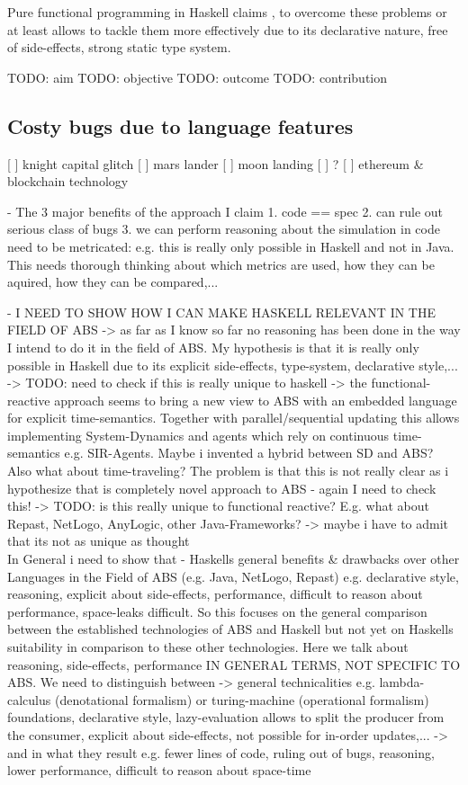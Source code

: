 Pure functional programming in Haskell claims \cite{hudak_history_2007}, \cite{hudak_haskell_1994} to overcome these problems or at least allows to tackle them more effectively due to its declarative nature, free of side-effects, strong static type system. 

TODO: aim 
TODO: objective
TODO: outcome 
TODO: contribution

\subsection{Costy bugs due to language features}
[ ] knight capital glitch
[ ] mars lander
[ ] moon landing
[ ] ?
[ ] ethereum \& blockchain technology

- The 3 major benefits of the approach I claim
	1. code == spec
	2. can rule out serious class of bugs
	3. we can perform reasoning about the simulation in code
	need to be metricated: e.g. this is really only possible in Haskell and not in Java. This needs thorough thinking about which metrics are used, how they can be aquired, how they can be compared,...
	
- I NEED TO SHOW HOW I CAN MAKE HASKELL RELEVANT IN THE FIELD OF ABS
	-> as far as I know so far no reasoning has been done in the way I intend to do it in the field of ABS. My hypothesis is that it is really only possible in Haskell due to its explicit side-effects, type-system, declarative style,... 
		-> TODO: need to check if this is really unique to haskell
	-> the functional-reactive approach seems to bring a new view to ABS with an embedded language for explicit time-semantics. Together with parallel/sequential updating this allows implementing System-Dynamics and agents which rely on continuous time-semantics e.g. SIR-Agents. Maybe i invented a hybrid between SD and ABS? Also what about time-traveling? The problem is that this is not really clear as i hypothesize that is completely novel approach to ABS - again I need to check this!
		-> TODO: is this really unique to functional reactive? E.g. what about Repast, NetLogo, AnyLogic, other Java-Frameworks? 
	-> maybe i have to admit that its not as unique as thought\\
	
In General i need to show that
- Haskells general benefits \& drawbacks over other Languages in the Field of ABS (e.g. Java, NetLogo, Repast) e.g. declarative style, reasoning, explicit about side-effects, performance, difficult to reason about performance, space-leaks difficult. So this focuses on the general comparison between the established technologies of ABS and Haskell but not yet on Haskells suitability in comparison to these other technologies. Here we talk about reasoning, side-effects, performance IN GENERAL TERMS, NOT SPECIFIC TO ABS. We need to distinguish between 
	-> general technicalities e.g. lambda-calculus (denotational formalism) or turing-machine (operational formalism) foundations, declarative style, lazy-evaluation allows to split the producer from the consumer, explicit about side-effects, not possible for in-order updates,...
	-> and in what they result e.g. fewer lines of code, ruling out of bugs, reasoning, lower performance, difficult to reason about space-time 
	
